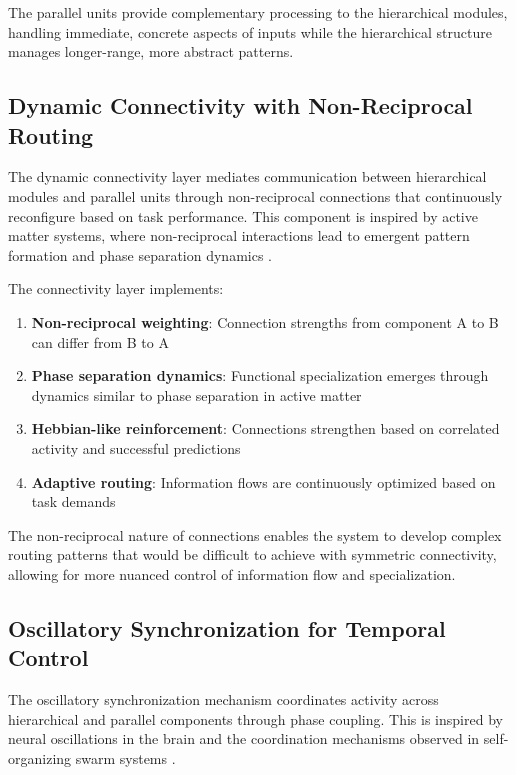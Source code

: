 \documentclass[11pt,a4paper,twocolumn]{article}
\begin{document}
The parallel units provide complementary processing to the hierarchical modules, handling immediate, concrete aspects of inputs while the hierarchical structure manages longer-range, more abstract patterns.

\subsection{Dynamic Connectivity with Non-Reciprocal Routing}

The dynamic connectivity layer mediates communication between hierarchical modules and parallel units through non-reciprocal connections that continuously reconfigure based on task performance. This component is inspired by active matter systems, where non-reciprocal interactions lead to emergent pattern formation and phase separation dynamics \cite{marchetti2024active, cichos2025roadmap}.

The connectivity layer implements:

\begin{enumerate}
    \item \textbf{Non-reciprocal weighting}: Connection strengths from component A to B can differ from B to A
    \item \textbf{Phase separation dynamics}: Functional specialization emerges through dynamics similar to phase separation in active matter
    \item \textbf{Hebbian-like reinforcement}: Connections strengthen based on correlated activity and successful predictions
    \item \textbf{Adaptive routing}: Information flows are continuously optimized based on task demands
\end{enumerate}

The non-reciprocal nature of connections enables the system to develop complex routing patterns that would be difficult to achieve with symmetric connectivity, allowing for more nuanced control of information flow and specialization.

\subsection{Oscillatory Synchronization for Temporal Control}

The oscillatory synchronization mechanism coordinates activity across hierarchical and parallel components through phase coupling. This is inspired by neural oscillations in the brain and the coordination mechanisms observed in self-organizing swarm systems \cite{zhu2024selforganizing}.
\end{document}
